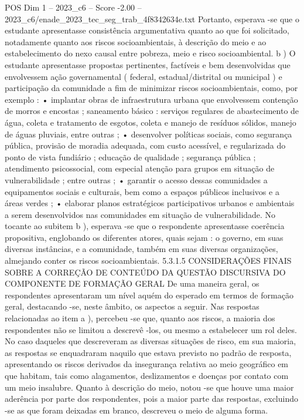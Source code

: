 \begin{textsample}{POS Dim 1 – 2023\_c6 – Score -2.00 – 2023\_c6/enade\_2023\_tec\_seg\_trab\_4f8342634e.txt}
Portanto, esperava -se que o estudante apresentasse consistência argumentativa quanto ao que foi solicitado, notadamente quanto aos riscos socioambientais, à descrição do meio e ao estabelecimento do nexo causal entre pobreza, meio e risco socioambiental. b ) O estudante apresentasse propostas pertinentes, factíveis e bem desenvolvidas que envolvessem ação governamental ( federal, estadual/distrital ou municipal ) e participação da comunidade a fim de minimizar riscos socioambientais, como, por exemplo : • implantar obras de infraestrutura urbana que envolvessem contenção de morros e encostas ; saneamento básico : serviços regulares de abastecimento de água, coleta e tratamento de esgotos, coleta e manejo de resíduos sólidos, manejo de águas pluviais, entre outras ; • desenvolver políticas sociais, como segurança pública, provisão de moradia adequada, com custo acessível, e regularizada do ponto de vista fundiário ; educação de qualidade ; segurança pública ; atendimento psicossocial, com especial atenção para grupos em situação de vulnerabilidade ; entre outras ; • garantir o acesso dessas comunidades a equipamentos sociais e culturais, bem como a espaços públicos inclusivos e a áreas verdes ; • elaborar planos estratégicos participativos urbanos e ambientais a serem desenvolvidos nas comunidades em situação de vulnerabilidade.
No tocante ao subitem b ), esperava -se que o respondente apresentasse coerência propositiva, englobando os diferentes atores, quais sejam : o governo, em suas diversas instâncias, e a comunidade, também em suas diversas organizações, almejando conter os riscos socioambientais. 5.3.1.5 CONSIDERAÇÕES FINAIS SOBRE A CORREÇÃO DE CONTEÚDO DA QUESTÃO DISCURSIVA DO COMPONENTE DE FORMAÇÃO GERAL De uma maneira geral, os respondentes apresentaram um nível aquém do esperado em termos de formação geral, destacando -se, neste âmbito, os aspectos a seguir.
Nas respostas relacionadas ao item a ), percebeu -se que, quanto aos riscos, a maioria dos respondentes não se limitou a descrevê -los, ou mesmo a estabelecer um rol deles.
No caso daqueles que descreveram as diversas situações de risco, em sua maioria, as respostas se enquadraram naquilo que estava previsto no padrão de resposta, apresentando os riscos derivados da insegurança relativa ao meio geográfico em que habitam, tais como alagamentos, deslizamentos e doenças por contato com um meio insalubre.
Quanto à descrição do meio, notou -se que houve uma maior aderência por parte dos respondentes, pois a maior parte das respostas, excluindo -se as que foram deixadas em branco, descreveu o meio de alguma forma.

\end{textsample}
